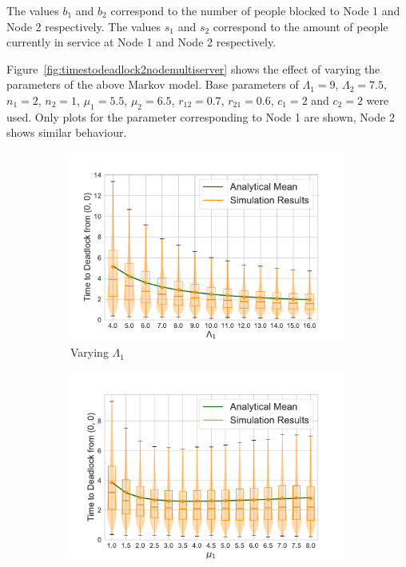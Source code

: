 \documentclass{article}
\numberwithin{equation}{section}
\begin{document}
The values $b_1$ and $b_2$ correspond to the number of people blocked to
Node 1 and Node 2 respectively.
The values $s_1$ and $s_2$ correspond to the amount of people currently in
service at Node 1 and Node 2 respectively.

Figure~\ref{fig:timestodeadlock2nodemultiserver} shows the effect of varying
the parameters of the above Markov model.
Base parameters of $\Lambda_1 = 9$, $\Lambda_2 = 7.5$, $n_1 = 2$, $n_2 = 1$,
$\mu_1 = 5.5$, $\mu_2 = 6.5$, $r_{12} = 0.7$, $r_{21} = 0.6$, $c_1 = 2$ and
$c_2 = 2$ were used.
Only plots for the parameter corresponding to Node 1 are shown, Node 2 shows
similar behaviour.

\begin{figure}[!htbp]
  \begin{center}
  \begin{subfigure}[b]{0.48\textwidth}
    \includegraphics[width=\textwidth]{images/2Nms_varyL1}
    \caption{Varying $\Lambda_1$}
    \label{fig:2Nms_L}
  \end{subfigure}
  \begin{subfigure}[b]{0.48\textwidth}
    \includegraphics[width=\textwidth]{images/2Nms_varymu1}

\end{subfigure}
\end{center}
\end{figure}
\end{document}
